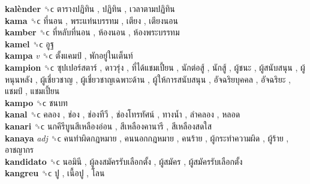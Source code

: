 \textbf{kalènder} ␝ϲ   ตารางปฏิทิน ,  ปฏิทิน ,  เวลาตามปฏิทิน   \\
\textbf{kama} ␝ϲ   ที่นอน ,  พระแท่นบรรทม ,  เตียง ,  เตียงนอน   \\
\textbf{kamber} ␝ϲ   ที่หลับที่นอน ,  ห้องนอน ,  ห้องพระบรรทม   \\
\textbf{kamel} ␝ϲ   อูฐ   \\
\textbf{kampa} \emph{v}  ␝ϲ   ตั้งแคมป์ ,  พักอยู่ในเต็นท์   \\
\textbf{kampion} ␝ϲ   ซุปเปอร์สตาร์ ,  ดาวรุ่ง ,  ที่ได้แชมเปี้ยน ,  นักต่อสู้ ,  นักสู้ ,  ผู้ชนะ ,  ผู้สนับสนุน ,  ผู้หนุนหลัง ,  ผู้เชี่ยวชาญ ,  ผู้เชี่ยวชาญเฉพาะด้าน ,  ผู้ให้การสนับสนุน ,  อัจฉริยบุคคล ,  อัจฉริยะ ,  แชมป์ ,  แชมเปี้ยน   \\
\textbf{kampo} ␝ϲ   ชนบท   \\
\textbf{kanal} ␝ϲ   คลอง ,  ช่อง ,  ช่องทีวี ,  ช่องโทรทัศน์ ,  ทางน้ำ ,  ลำคลอง ,  หลอด   \\
\textbf{kanari} ␝ϲ   นกคีรีบูนสีเหลืองอ่อน ,  สีเหลืองคานารี ,  สีเหลืองสดใส   \\
\textbf{kanaya} \emph{adj}  ␝ϲ   คนทำผิดกฎหมาย ,  คนนอกกฎหมาย ,  คนร้าย ,  ผู้กระทำความผิด ,  ผู้ร้าย ,  อาชญากร   \\
\textbf{kandidato} ␝ϲ   นอมินี ,  ผู้ลงสมัครรับเลือกตั้ง ,  ผู้สมัคร ,  ผู้สมัครรับเลือกตั้ง   \\
\textbf{kangreu} ␝ϲ   ปู ,  เนื้อปู ,  โลน   \\
